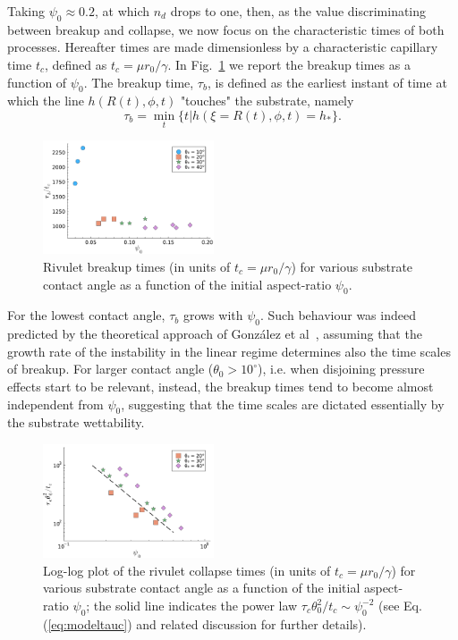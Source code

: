 \documentclass[twoside,twocolumn,9pt]{article}
\begin{document}
Taking $\psi_0 \approx 0.2$, at which $n_d$ drops to one, then, as the value discriminating between breakup and collapse, we now focus on the characteristic times of both processes.
Hereafter times are made dimensionless by a characteristic capillary time $t_c$, defined as $t_c = \mu r_0/\gamma$.
In Fig.~\ref{fig:breakuptimes} we report the breakup times as a function of $\psi_0$.
The breakup time, $\tau_b$, is defined as the earliest instant of time at which the line $h(R(t),\phi,t)$ "touches" the substrate, namely
\begin{equation}\label{eq:breakuptime}
\tau_b = \min_t \{t | h(\xi=R(t),\phi,t) = h_{\ast}\}.
\end{equation}
\begin{figure}
    \centering
    \includegraphics[width = 0.45\textwidth]{Figure_3.pdf}
    \caption{Rivulet breakup times (in units of $t_c = \mu r_0/\gamma$) for various substrate contact angle as a function of the initial aspect-ratio $\psi_0$.}
    \label{fig:breakuptimes}
\end{figure}
For the lowest contact angle, $\tau_b$ grows with $\psi_0$. 
Such behaviour was indeed predicted by the theoretical approach of Gonz\'alez et al~\cite{gonzalezStabilityLiquidRing2013}, assuming that the growth rate of the instability in the linear regime determines also the time scales of breakup. 
For larger contact angle ($\theta_0 > 10^{\circ}$), i.e. when disjoining pressure effects start to be relevant, instead, the breakup times tend to become almost independent from $\psi_0$, suggesting that the time scales are dictated essentially by the substrate wettability.\\
\begin{figure}
    \centering
    \includegraphics[width = 0.45\textwidth]{Figure_4.pdf}
    \caption{Log-log plot of the rivulet collapse times (in units of $t_c = \mu r_0/\gamma$) for various substrate contact angle as a function of the initial aspect-ratio $\psi_0$; the solid line indicates the power law $\tau_c \theta_0^2/t_c \sim \psi_0^{-2}$ (see Eq.(\ref{eq:modeltauc}) and related discussion for further details).}
    \label{fig:collapsetimes}
\end{figure}
\end{document}
